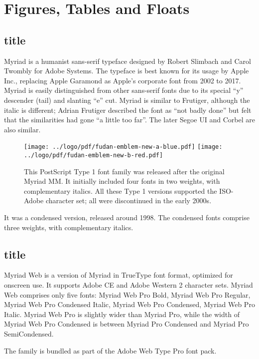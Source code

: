\documentclass[twoside]{fduthesis-en}
\begin{document}
\chapter{Figures, Tables and Floats}

\section{title}

Myriad is a humanist sans-serif typeface designed by Robert Slimbach
and Carol Twombly for Adobe Systems. The typeface is best known for
its usage by Apple Inc., replacing Apple Garamond as Apple's corporate
font from 2002 to 2017. Myriad is easily distinguished from other
sans-serif fonts due to its special ``y'' descender (tail) and slanting
``e'' cut. Myriad is similar to Frutiger, although the italic is different;
Adrian Frutiger described the font as ``not badly done'' but felt that
the similarities had gone ``a little too far''. The later Segoe UI and
Corbel are also similar.

\begin{figure}[h]
  \centering
  \texttt{[image: ../logo/pdf/fudan-emblem-new-a-blue.pdf]}
  \texttt{[image: ../logo/pdf/fudan-emblem-new-b-red.pdf]}
  \caption{This PostScript Type 1 font family was released after the
    original Myriad MM. It initially included four fonts in two weights,
    with complementary italics. All these Type 1 versions supported
    the ISO-Adobe character set; all were discontinued in the early 2000s.}
\end{figure}

It was a condensed version, released around 1998. The condensed fonts
comprise three weights, with complementary italics.

\section{title}

Myriad Web is a version of Myriad in TrueType font format, optimized
for onscreen use. It supports Adobe CE and Adobe Western 2 character
sets. Myriad Web comprises only five fonts: Myriad Web Pro Bold, Myriad
Web Pro Regular, Myriad Web Pro Condensed Italic, Myriad Web Pro Condensed,
Myriad Web Pro Italic. Myriad Web Pro is slightly wider than Myriad Pro,
while the width of Myriad Web Pro Condensed is between Myriad Pro
Condensed and Myriad Pro SemiCondensed.

The family is bundled as part of the Adobe Web Type Pro font pack.
\end{document}
